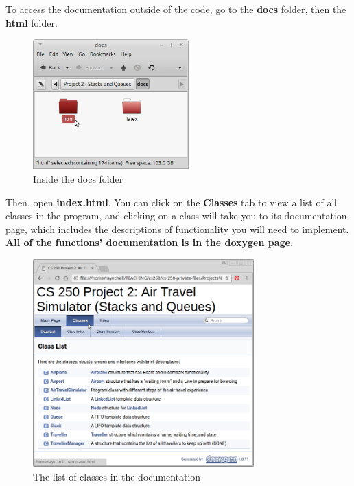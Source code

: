 \documentclass[a4paper,12pt,oneside]{book}
\begin{document}
    To access the documentation outside of the code, go to the \textbf{docs}
    folder, then the \textbf{html} folder.

    \begin{figure}[h]
        \center
        \includegraphics[width=6cm]{images/project2-docsfolder.png}
        \caption{Inside the docs folder}
    \end{figure}

    Then, open \textbf{index.html}. You can click on the \textbf{Classes}
    tab to view a list of all classes in the program, and clicking on
    a class will take you to its documentation page, which includes the
    descriptions of functionality you will need to implement.
    \textbf{All of the functions' documentation is in the doxygen page.}

    \begin{figure}[h]
        \center
        \includegraphics[height=8cm]{images/project2-classlist.png}
        \caption{The list of classes in the documentation}
    \end{figure}
\end{document}
